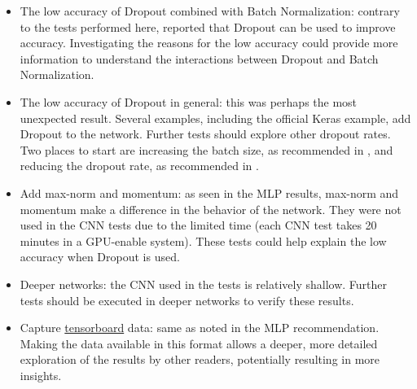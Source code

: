 \documentclass[../CAP6619_term_project_cgarbin.tex]{subfiles}
\begin{document}
\begin{itemize}
\item The low accuracy of Dropout combined with Batch Normalization: contrary to the tests performed here, \cite{Li2018} reported that Dropout can be used to improve accuracy. Investigating the reasons for the low accuracy could provide more information to understand the interactions between Dropout and Batch Normalization.
\item The low accuracy of Dropout in general: this was perhaps the most unexpected result. Several examples, including the official Keras example, add Dropout to the network. Further tests should explore other dropout rates. Two places to start are increasing the batch size, as recommended in \cite{Luo2018}, and reducing the dropout rate, as recommended in \cite{Li2018}.
\item Add max-norm and momentum: as seen in the MLP results, max-norm and momentum make a difference in the behavior of the network. They were not used in the CNN tests due to the limited time (each CNN test takes 20 minutes in a GPU-enable system). These tests could help explain the low accuracy when Dropout is used.
\item Deeper networks: the CNN used in the tests is relatively shallow. Further tests should be executed in deeper networks to verify these results.
\item Capture \href{https://www.tensorflow.org/guide/summaries_and_tensorboard}{tensorboard} data: same as noted in the MLP recommendation. Making the data available in this format allows a deeper, more detailed exploration of the results by other readers, potentially resulting in more insights.
\end{itemize}
\end{document}
